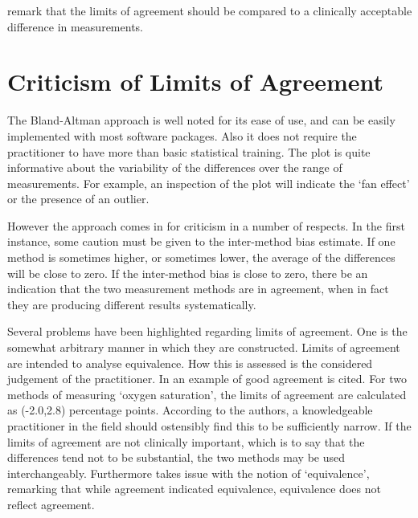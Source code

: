 \documentclass[12pt, a4paper]{report}
\theoremstyle{plain}
\theoremstyle{definition}
\theoremstyle{remark}
\begin{document}
\citet{Dewitte} remark that the limits of agreement should be
compared to a clinically acceptable difference in measurements.

\section{Criticism of Limits of Agreement}
The Bland-Altman approach is well noted for its ease of use, and can be easily implemented with most software packages. Also it does not require the practitioner to have more than basic statistical training. The plot is quite informative about the variability of the differences over the range of measurements. For
example, an inspection of the plot will indicate the `fan effect' or the presence of an outlier.





%
%

However the approach comes in for criticism in a number of respects. In the first instance, some caution must be given to the inter-method bias estimate.
If one method is sometimes higher, or sometimes lower, the average of the differences will be close to zero. If the inter-method bias is close to zero, there be an indication that the two measurement methods are in agreement, when in fact they are producing different results systematically.

Several problems have been highlighted regarding limits of agreement. One is the somewhat arbitrary manner in which they are constructed. Limits of agreement are intended to analyse equivalence. How this is assessed is the considered judgement of the practitioner. In \citet{BA86} an example of good agreement is cited. For two methods of measuring `oxygen saturation', the limits of agreement are calculated as (-2.0,2.8) percentage points. According to the authors, a knowledgeable practitioner in the field should ostensibly find this to be sufficiently narrow. If the limits of agreement are not clinically important, which is to say that the differences tend not to be substantial, the two methods may be used interchangeably. Furthermore \citet{DunnSEME} takes issue
with the notion of `equivalence', remarking that while agreement
indicated equivalence, equivalence does not reflect agreement.
\end{document}
